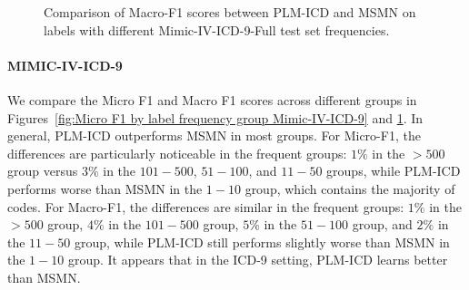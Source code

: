 \documentclass[11pt]{article}
\begin{document}
\begin{figure}[!t]


    \caption{Comparison of Macro-F1 scores between PLM-ICD and MSMN on labels with different Mimic-IV-ICD-9-Full test set frequencies.}
    \label{fig:Macro F1 by label frequency group Mimic-IV-ICD-9}
\end{figure}
\paragraph{MIMIC-IV-ICD-9}
We compare the Micro F1 and Macro F1 scores across different groups in Figures~\ref{fig:Micro F1 by label frequency group Mimic-IV-ICD-9} and \ref{fig:Macro F1 by label frequency group Mimic-IV-ICD-9}. In general, PLM-ICD outperforms MSMN in most groups. For Micro-F1, the differences are particularly noticeable in the frequent groups: $1\%$ in the $>500$ group versus $3\%$ in the $101-500$, $51-100$, and $11-50$ groups, while PLM-ICD performs worse than MSMN in the $1-10$ group, which contains the majority of codes. For Macro-F1, the differences are similar in the frequent groups: $1\%$ in the $>500$ group, $4\%$ in the $101-500$ group, $5\%$ in the $51-100$ group, and $2\%$ in the $11-50$ group, while PLM-ICD still performs slightly worse than MSMN in the $1-10$ group. It appears that in the ICD-9 setting, PLM-ICD learns better than MSMN.
\end{document}
